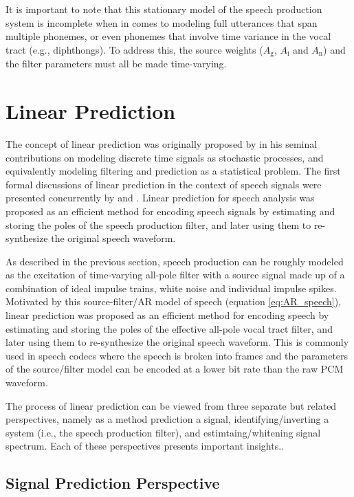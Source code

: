 It is important to note that this stationary model of the speech production system is incomplete when in comes to modeling full utterances that span multiple phonemes, or even phonemes that involve time variance in the vocal tract (e.g., diphthongs). To address this, the source weights ($A_\mathrm{g}$, $A_\mathrm{i}$ and $A_\mathrm{n}$) and the filter parameters must all be made time-varying.

\section{Linear Prediction} \label{linear_prediction}

The concept of linear prediction was originally proposed by \cite{wiener1949extrapolation} in his seminal contributions on modeling discrete time signals as stochastic processes, and equivalently modeling filtering and prediction as a statistical problem. The first formal discussions of linear prediction in the context of speech signals were presented concurrently by \cite{saito1967theoretical} and \cite{atal1970adaptive}. Linear prediction for speech analysis was proposed as an efficient method for encoding speech signals by estimating and storing the poles of the speech production filter, and later using them to re-synthesize the original speech waveform. 

As described in the previous section, speech production can be roughly modeled as the excitation of time-varying all-pole filter with a source signal made up of a combination of ideal impulse trains, white noise and individual impulse spikes. Motivated by this source-filter/AR model of speech (equation \ref{eq:AR_speech}), linear prediction was proposed as an efficient method for encoding speech by estimating and storing the poles of the effective all-pole vocal tract filter, and later using them to re-synthesize the original speech waveform. This is commonly used in speech codecs where the speech is broken into frames and the parameters of the source/filter model can be encoded at a lower bit rate than the raw PCM waveform.

The process of linear prediction can be viewed from three separate but related perspectives, namely as a method prediction a signal, identifying/inverting a system (i.e., the speech production filter), and estimtaing/whitening signal spectrum. Each of these perspectives presents important insights..

\subsection{Signal Prediction Perspective} \label{lp_signal_perspective}

